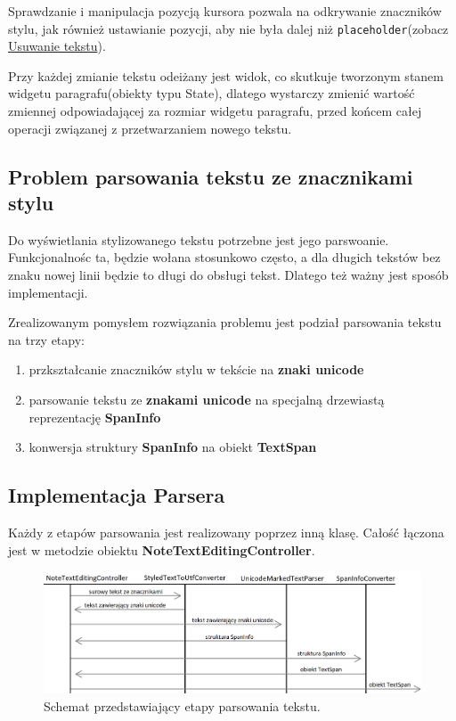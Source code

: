 Sprawdzanie i manipulacja pozycją kursora pozwala na odkrywanie znaczników stylu, jak również ustawianie pozycji, aby nie była dalej niż \verb|placeholder|(zobacz \hyperref[eq:usuwanieTekstu]{Usuwanie tekstu}).

Przy każdej zmianie tekstu odeiżany jest widok, co skutkuje tworzonym stanem widgetu paragrafu(obiekty typu State), dlatego wystarczy zmienić wartość zmiennej odpowiadającej za rozmiar widgetu paragrafu, przed końcem całej operacji związanej z przetwarzaniem nowego tekstu.

\subsection{Problem parsowania tekstu ze znacznikami stylu}

Do wyświetlania stylizowanego tekstu potrzebne jest jego parswoanie. Funkcjonalnośc ta, będzie wołana stosunkowo często, a dla długich tekstów bez znaku nowej linii będzie to długi do obsługi tekst. Dlatego też ważny jest sposób implementacji.

Zrealizowanym pomysłem rozwiązania problemu jest podział parsowania tekstu na trzy etapy:
\begin{enumerate}
    \setlength\itemsep{0mm}
    \item przkształcanie znaczników stylu w tekście na \textbf{znaki unicode}
    \item parsowanie tekstu ze \textbf{znakami unicode} na specjalną drzewiastą reprezentację \textbf{SpanInfo}
    \item konwersja struktury \textbf{SpanInfo} na obiekt \textbf{TextSpan}
\end{enumerate}

\subsection{Implementacja Parsera}

Każdy z etapów parsowania jest realizowany poprzez inną klasę. Całość łączona jest w metodzie obiektu \textbf{NoteTextEditingController}.
\newline
\begin{figure}[ht]
    \centering
    \includegraphics[width=\linewidth]{images/etapy_parsowania.png}
    \caption{Schemat przedstawiający etapy parsowania tekstu.}
    \label{fig:etapyParsowania}
\end{figure}

